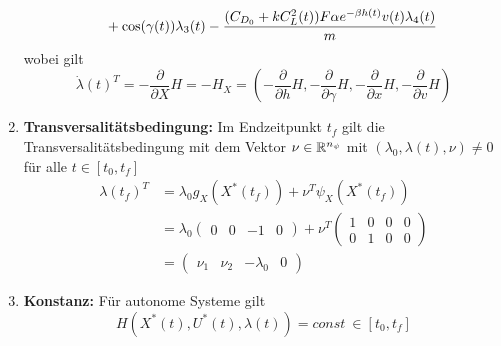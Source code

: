 \begin{enumerate}
\[\begin{split}
            &\hspace{7mm} + \cos(\gamma(t)) \lambda_3(t) - \dfrac{(C_{D_0} + k C_L^2(t)) F \alpha e^{-\beta h(t)} v(t) \lambda_4(t)}{m}
        \end{split}\]
        wobei gilt 
        \[\dot{\lambda}(t)^T = - \dfrac{\partial}{\partial X} H = -H_{X} = \left( -\dfrac{\partial}{\partial h} H, -\dfrac{\partial}{\partial \gamma} H, -\dfrac{\partial}{\partial x} H, -\dfrac{\partial}{\partial v} H \right)\]
    \item \textbf{Transversalitätsbedingung:} Im Endzeitpunkt $t_f$ gilt die Transversalitätsbedingung mit dem Vektor $\nu \in \mathbb{R}^{n_{\psi}}$ mit $(\lambda_0,\lambda(t),\nu) \neq 0$ für alle $t \in [t_0,t_f]$
        \[\begin{split}
            \lambda(t_f)^T &= \lambda_0 g_X(X^{\ast}(t_f)) + \nu^T \psi_X(X^{\ast}(t_f)) \\\
            &= \lambda_0 
            \begin{pmatrix}
            0 & 0 & -1 & 0
            \end{pmatrix}  
            + \nu^T 
            \begin{pmatrix}
            1 & 0 & 0 & 0 \\
            0 & 1 & 0 & 0 
            \end{pmatrix}  \\\
            &= \begin{pmatrix}
            \nu_1 & \nu_2 & -\lambda_0 & 0 
            \end{pmatrix}
        \end{split}\]
    \item \textbf{Konstanz:} Für autonome Systeme gilt \[H(X^{\ast}(t),U^{\ast}(t), \lambda(t)) = const \ \in [t_0,t_f]\]
\end{enumerate}













